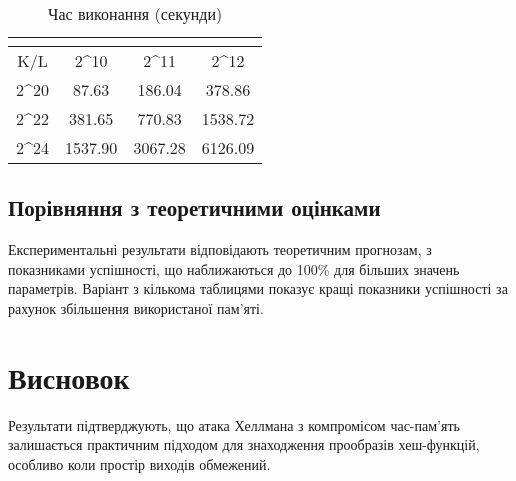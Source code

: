 \documentclass[12pt]{article}
\begin{document}
\begin{table}[H]
\centering
\begin{tabular}{@{}c|ccc@{}}
\multicolumn{4}{c}{} \\
\midrule
K/L & 2^{10} & 2^{11} & 2^{12} \\
\midrule
2^{20} & 87.63 & 186.04 & 378.86 \\
2^{22} & 381.65 & 770.83 & 1538.72 \\
2^{24} & 1537.90 & 3067.28 & 6126.09 \\
\bottomrule
\end{tabular}
\caption{Час виконання (секунди)}
\end{table}

\subsection{Порівняння з теоретичними оцінками}
Експериментальні результати відповідають теоретичним прогнозам, з показниками успішності, що наближаються до 100\% для більших значень параметрів. Варіант з кількома таблицями показує кращі показники успішності за рахунок збільшення використаної пам'яті.

\section{Висновок}
Результати підтверджують, що атака Хеллмана з компромісом час-пам'ять залишається практичним підходом для знаходження прообразів хеш-функцій, особливо коли простір виходів обмежений.
\end{document}
